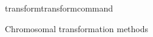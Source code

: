 \begin{command}{transform}{transformcommand}
\begin{arguments}
\begin{argumentgroup}{Chromosomal transformation methods}
\begin{description}

                           


\end{description}
\end{argumentgroup}
\end{arguments}
\end{command}
